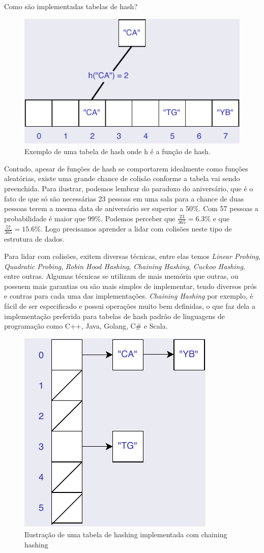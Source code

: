 \documentclass{beamer}
\begin{document}
\begin{frame}
\begin{columns}[t]
\begin{column}{0.5\textwidth}
\begin{block}{Como são implementadas tabelas de hash?}
    \begin{figure}
      \includegraphics[width=0.6\linewidth]{figuras/hashTable.pdf}
      \caption{Exemplo de uma tabela de hash onde h é a função de hash.}
    \end{figure}

    Contudo, apesar de funções de hash se comportarem idealmente como funções aleatórias, existe uma grande chance de colisão conforme a tabela vai sendo preenchida. Para ilustrar, podemos lembrar do paradoxo do aniversário, que é o fato de que só são necessárias 23 pessoas em uma sala para a chance de duas pessoas terem a mesma data de aniversário ser superior a \(50\%\). Com 57 pessoas a probabilidade é maior que \(99\%\). Podemos perceber que \( \frac{23}{365} = 6.3\%\) e que \( \frac{57}{365} = 15.6\% \). Logo precisamos aprender a lidar com colisões neste tipo de estrutura de dados.
    
    Para lidar com colisões, exitem diversas técnicas, entre elas temos \textit{Linear Probing}, \textit{Quadratic Probing}, \textit{Robin Hood Hashing}, \textit{Chaining Hashing}, \textit{Cuckoo Hashing}, entre outras. Algumas técnicas se utilizam de mais memória que outras, ou possuem mais garantias ou são mais simples de implementar, tendo diversos prós e contras para cada uma das implementações. \textit{Chaining Hashing} por exemplo, é fácil de ser especificado e possui operações muito bem definidas, o que faz dela a implementação preferida para tabelas de hash padrão de linguagens de programação como C++, Java, Golang, C\# e Scala. 
    
    \begin{figure}
      \includegraphics[width=0.35\linewidth]{figuras/chainingHashing.pdf}
      \caption{Ilustração de uma tabela de hashing implementada com chaining hashing}
    \end{figure}


\end{block}
\end{column}
\end{columns}
\end{frame}
\end{document}
